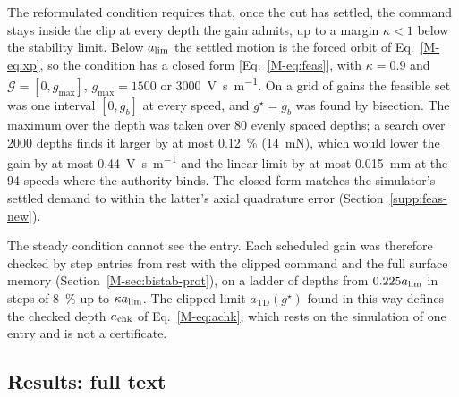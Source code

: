 The reformulated condition requires that, once the cut has settled, the command stays inside the clip at every depth the gain admits, up to a margin $\kappa<1$ below the stability limit. Below $a_{\lim}$ the settled motion is the forced orbit of Eq.~\eqref{M-eq:xp}, so the condition has a closed form [Eq.~\eqref{M-eq:feas}], with $\kappa=0.9$ and $\mathcal G=[0,g_{\max}]$, $g_{\max}=1500$ or \SI{3000}{\volt\second\per\metre}. On a grid of gains the feasible set was one interval $[0,g_b]$ at every speed, and $g^\star=g_b$ was found by bisection. The maximum over the depth was taken over 80 evenly spaced depths; a search over 2000 depths finds it larger by at most \SI{0.12}{\percent} (\SI{14}{\milli\newton}), which would lower the gain by at most \SI{0.44}{\volt\second\per\metre} and the linear limit by at most \SI{0.015}{\milli\metre} at the 94 speeds where the authority binds. The closed form matches the simulator's settled demand to within the latter's axial quadrature error (Section~\ref{supp:feas-new}).

The steady condition cannot see the entry. Each scheduled gain was therefore checked by step entries from rest with the clipped command and the full surface memory (Section~\ref{M-sec:bistab-prot}), on a ladder of depths from $0.225a_{\lim}$ in steps of \SI{8}{\percent} up to $\kappa a_{\lim}$. The clipped limit $a_{\mathrm{TD}}(g^\star)$ found in this way defines the checked depth $a_{\mathrm{chk}}$ of Eq.~\eqref{M-eq:achk}, which rests on the simulation of one entry and is not a certificate.

\subsection{Results: full text}\label{supp:std-feas-res}

